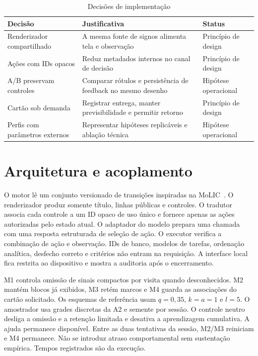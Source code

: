 \documentclass[conference,a4paper]{IEEEtran}
\begin{document}
\begin{table}[ht]
\caption{Decisões de implementação}\small
\begin{tabularx}{\columnwidth}{@{}YYP{.19\columnwidth}@{}}\toprule
Decisão & Justificativa & Status\\\midrule
Renderizador compartilhado & A mesma fonte de signos alimenta tela e observação & Princípio de design\\
Ações com IDs opacos & Reduz metadados internos no canal de decisão & Princípio de design\\
A/B preservam controles & Comparar rótulos e persistência de feedback no mesmo desenho & Hipótese operacional\\
Cartão sob demanda & Registrar entrega, manter previsibilidade e permitir retorno & Princípio de design\\
Perfis com parâmetros externos & Representar hipóteses replicáveis e ablação técnica & Hipótese operacional\\\bottomrule
\end{tabularx}
\end{table}

\section{Arquitetura e acoplamento}
O motor lê um conjunto versionado de transições inspiradas na MoLIC~\cite{molic}\cite[pp. 9--31]{guiamolic}. O renderizador produz somente título, linhas públicas e controles. O tradutor associa cada controle a um ID opaco de uso único e fornece apenas as ações autorizadas pelo estado atual. O adaptador do modelo prepara uma chamada com uma resposta estruturada de seleção de ação. O executor verifica a combinação de ação e observação. IDs de banco, modelos de tarefas, ordenação analítica, desfecho correto e critérios não entram na requisição. A interface local fica restrita ao dispositivo e mostra a auditoria após o encerramento.

 M1 controla omissão de sinais compactos por visita quando desconhecidos. M2 mantém blocos já exibidos, M3 retém marcos e M4 guarda as associações do cartão solicitado. Os esquemas de referência usam $q=0{,}35$, $k=a=1$ e $l=5$. O amostrador usa grades discretas da A2 e semente por sessão. O controle neutro desliga a omissão e a retenção limitada e desativa a aprendizagem cumulativa. A ajuda permanece disponível. Entre as duas tentativas da sessão, M2/M3 reiniciam e M4 permanece. Não se introduz atraso comportamental sem sustentação empírica. Tempos registrados são da execução.
\end{document}
